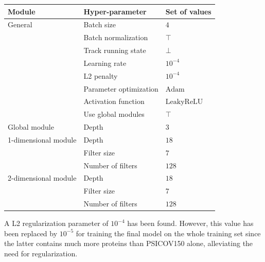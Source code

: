     \begin{table}[H]
        \centering
        \begin{tabular}{lll}
          \hline
          Module & Hyper-parameter & Set of values \\
          \hline
          \hline
          General & Batch size & $4$ \\
                  & Batch normalization & $\top$ \\
                  & Track running state & $\bot$ \\
                  & Learning rate & $10^{-4}$ \\
                  & L2 penalty & $10^{-4}$ \\
                  & Parameter optimization & $\text{Adam}$ \\
                  & Activation function & $\text{LeakyReLU}$ \\
                  & Use global modules & $\top$ \\
          \hline
          Global module & Depth & $3$ \\
          \hline
          1-dimensional module & Depth & $18$ \\
                               & Filter size & $7$ \\
                               & Number of filters & $128$ \\
          \hline
          2-dimensional module & Depth & $18$ \\
                               & Filter size & $7$ \\
                               & Number of filters & $128$ \\
          \hline
        \end{tabular}
        \label{besthp}
    \end{table}

    A L2 regularization parameter of $10^{-4}$ has been found.
    However, this value has been replaced
    by $10^{-5}$ for training the final model on the whole training set since
    the latter contains much more proteins than PSICOV150 alone, alleviating
    the need for regularization.

